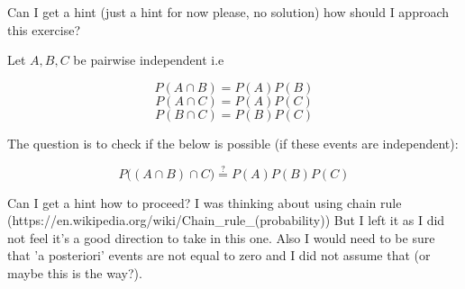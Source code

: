 \documentclass{article}
\begin{document}
Can I get a hint (just a hint for now please, no solution) how should I approach this exercise?


Let $A, B, C$ be pairwise independent i.e 

\begin{equation*}
    P(A \cap B) = P(A)P(B)
\end{equation*}
\begin{equation*}
    P(A \cap C) = P(A)P(C)
\end{equation*}
\begin{equation*}
    P(B\cap C) = P(B)P(C)
\end{equation*}

The question is to check if the below is possible (if these events are independent):

\begin{equation*}
    P\Big( (A \cap B) \cap C\Big) \stackrel{?}{=} P(A)P(B)P(C) 
\end{equation*}


Can I get a hint how to proceed? I was thinking about using chain rule (https://en.wikipedia.org/wiki/Chain_rule_(probability))
But I left it as I did not feel it's a good direction to take in this one. Also I would need to be sure that 'a posteriori' events
are not equal to zero and I did not assume that (or maybe this is the way?).


\end{document}
